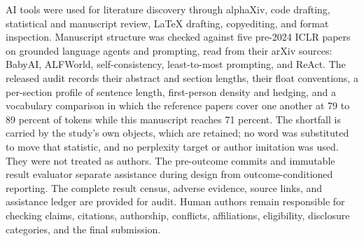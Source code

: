 AI tools were used for literature discovery through alphaXiv, code drafting, statistical and manuscript review, LaTeX drafting, copyediting, and format inspection. Manuscript structure was checked against five pre-2024 ICLR papers on grounded language agents and prompting, read from their arXiv sources: BabyAI, ALFWorld, self-consistency, least-to-most prompting, and ReAct. The released audit records their abstract and section lengths, their float conventions, a per-section profile of sentence length, first-person density and hedging, and a vocabulary comparison in which the reference papers cover one another at 79 to 89 percent of tokens while this manuscript reaches 71 percent. The shortfall is carried by the study's own objects, which are retained; no word was substituted to move that statistic, and no perplexity target or author imitation was used. They were not treated as authors. The pre-outcome commits and immutable result evaluator separate assistance during design from outcome-conditioned reporting. The complete result census, adverse evidence, source links, and assistance ledger are provided for audit. Human authors remain responsible for checking claims, citations, authorship, conflicts, affiliations, eligibility, disclosure categories, and the final submission.
